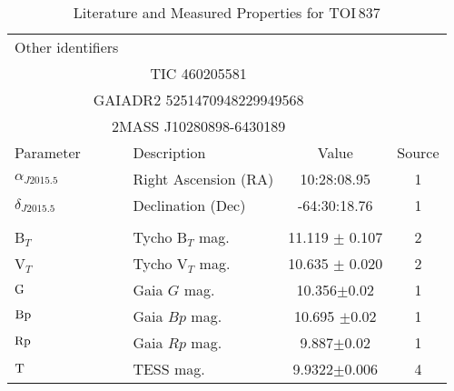 \begin{table}
\scriptsize
\setlength{\tabcolsep}{2pt}
\centering
\caption{Literature and Measured Properties for TOI$\,$837}
\begin{tabular}{llcc}
  \hline
  \hline
Other identifiers\dotfill & \\
\multicolumn{3}{c}{TIC 460205581} \\
\multicolumn{3}{c}{GAIADR2 5251470948229949568} \\
\multicolumn{3}{c}{2MASS J10280898-6430189}\\
\hline
\hline
Parameter & Description & Value & Source\\
\hline 
$\alpha_{J2015.5}$\dotfill	&Right Ascension (RA)\dotfill & 10:28:08.95 & 1	\\
$\delta_{J2015.5}$\dotfill	&Declination (Dec)\dotfill & -64:30:18.76 & 1	\\
\\
B$_T$\dotfill			&Tycho B$_T$ mag.\dotfill & 11.119 $\pm$ 0.107		& 2	\\ %
V$_T$\dotfill			&Tycho V$_T$ mag.\dotfill & 10.635 $\pm$ 0.020		& 2	\\
${\rm G}$\dotfill     & Gaia $G$ mag.\dotfill     & 10.356$\pm$0.02 & 1\\
${\rm Bp}$\dotfill     & Gaia $Bp$ mag.\dotfill     & 10.695 $\pm$0.02 & 1\\
${\rm Rp}$\dotfill     & Gaia $Rp$ mag.\dotfill     & 9.887$\pm$0.02 & 1\\
${\rm T}$\dotfill     & TESS mag.\dotfill     & 9.9322$\pm$0.006 & 4\\

\end{tabular}
\end{table}
